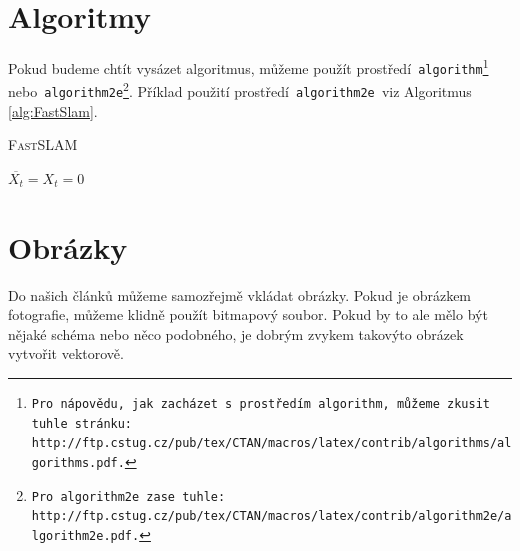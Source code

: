 \documentclass[a4paper,11pt]{article}
\begin{document}
\section{Algoritmy}
\label{sec:Algoritmy_3}
Pokud budeme chtít vysázet algoritmus, můžeme použít prostředí\texttt{ algorithm\footnote{Pro nápovědu, jak zacházet s~prostředím\texttt{ algorithm}, můžeme zkusit tuhle stránku: \\ http://ftp.cstug.cz/pub/tex/CTAN/macros/latex/contrib/algorithms/algorithms.pdf.} } nebo\texttt{ algorithm2e\footnote{Pro\texttt{ algorithm2e }zase tuhle:
http://ftp.cstug.cz/pub/tex/CTAN/macros/latex/contrib/algorithm2e/algorithm2e.pdf.}}.
Příklad použití prostředí\texttt{ algorithm2e }viz Algoritmus \ref{alg:FastSlam}.
\bigskip
\begin{algorithm}
\label{alg:FastSlam}
\SetNlSty{}{}{:}
\SetInd{8mm}{0cm}
\SetNlSkip{-0.43cm}
\caption{\textsc{FastSLAM}}
\BlankLine
\Indp \Indpp
$\overline{X_t} = X_t = 0$ \\
\end{algorithm}

\section{Obrázky}

Do našich článků můžeme samozřejmě vkládat obrázky. Pokud je obrázkem fotografie,
můžeme klidně použít bitmapový soubor. Pokud by to ale mělo být nějaké schéma nebo něco podobného, je dobrým zvykem takovýto obrázek vytvořit vektorově.
\end{document}
